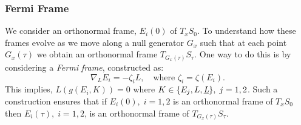 \documentclass[12pt, a4paper]{report}
\theoremstyle{bfnote}
\newcommand{\underit}[1]{\textit{\underbar{#1}}}
\begin{document}
\subsubsection{Fermi Frame}
We consider an orthonormal frame, $E_i\left(0\right)$ of $T_x S_0$. To
understand how these frames evolve as we move along a null generator $G_x$ such
that at each point $G_x\left(\tau\right)$ we obtain an orthonormal frame
$T_{G_x\left(\tau\right)}S_\tau$. One way to do this is by considering a
\textit{Fermi frame}, constructed as:
\begin{equation*}
    \nabla_L E_i = -\zeta_i L, \quad \text{where } \zeta_i = \zeta\left(E_i\right).
\end{equation*}
This implies, $L\left(g\left(E_i, K\right)\right) = 0$ where $K\in \{E_j, L,
\underit{L}\}, \; j = 1, 2$. Such a construction ensures that if
$E_i\left(0\right), \; i = 1, 2$ is an orthonormal frame of $T_x S_0$ then
$E_i\left(\tau\right), \; i = 1, 2$, is an orthonormal frame of $T_{G_x\left(\tau\right)}S_\tau$.
\end{document}
